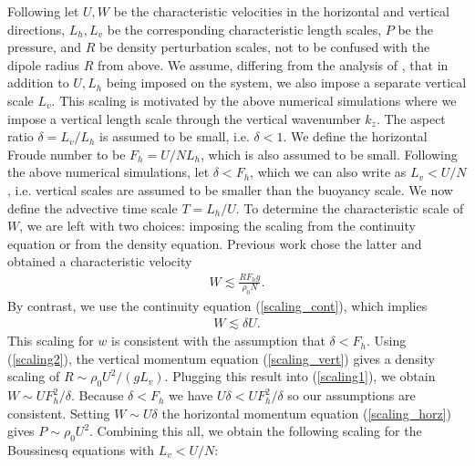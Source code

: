 Following \cite{bc2001} let $U,W$ be the characteristic velocities in the horizontal and vertical directions, $L_{h},L_{v}$ be the corresponding characteristic length scales, $P$ be the pressure, and $R$ be density perturbation scales, not to be confused with the dipole radius $R$ from above. We assume, differing from the analysis of \cite{lilly1983,bc2001}, that in addition to $U,L_{h}$ being imposed on the system, we also impose a separate vertical scale $L_{v}$. This scaling is motivated by the above numerical simulations where we impose a vertical length scale through the vertical wavenumber $k_{z}$. The aspect ratio $\delta=L_{v}/L_{h}$ is assumed to be small, i.e. $\delta<1$. We define the horizontal Froude number to be $F_{h}=U/NL_{h}$, which is also assumed to be small. Following the above numerical simulations, let $\delta < F_{h}$, which we can also write as $L_{v} < U/N$, i.e. vertical scales are assumed to be smaller than the buoyancy scale. We now define the advective time scale $T=L_{h}/U$. 
To determine the characteristic scale of $W$, we are left with two choices: imposing the scaling from the continuity equation or from the density equation. Previous work \cite{bc2001} chose the latter and obtained a characteristic velocity 
\begin{align}
W \lesssim \frac{RF_{h}g}{\rho_{0}N}\label{scaling1}. 
\end{align}
By contrast, we use the continuity equation (\ref{scaling_cont}), which implies
\begin{align}
W \lesssim \delta U\label{scaling2}.
\end{align}
This scaling for $w$ is consistent with the assumption that $\delta < F_{h}$. Using (\ref{scaling2}), the vertical momentum equation (\ref{scaling_vert}) gives a density scaling of $R\sim \rho_{0}U^{2}/(gL_{v})$. Plugging this result into (\ref{scaling1}), we obtain $W\sim UF_{h}^{2}/\delta$. Because $\delta < F_{h}$ we have $U\delta < UF_{h}^{2}/\delta$ so our assumptions are consistent. Setting $W\sim U\delta$ the horizontal momentum equation (\ref{scaling_horz}) gives $P\sim \rho_{0}U^{2}$. Combining this all, we obtain the following scaling for the Boussinesq equations with $L_{v} < U/N$:  

